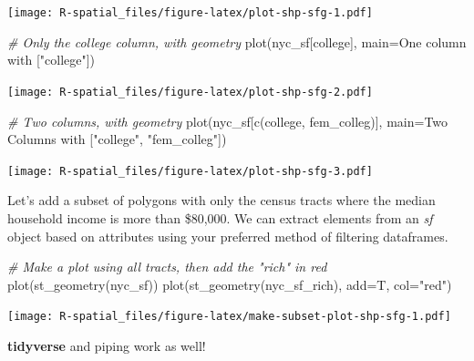 \documentclass[
  11pt,
]{book}
\newenvironment{Shaded}{\begin{snugshade}}{\end{snugshade}}
\newcommand{\AttributeTok}[1]{\textcolor[rgb]{0.77,0.63,0.00}{#1}}
\newcommand{\CommentTok}[1]{\textcolor[rgb]{0.56,0.35,0.01}{\textit{#1}}}
\newcommand{\FunctionTok}[1]{\textcolor[rgb]{0.00,0.00,0.00}{#1}}
\newcommand{\NormalTok}[1]{#1}
\newcommand{\StringTok}[1]{\textcolor[rgb]{0.31,0.60,0.02}{#1}}
\begin{document}
\texttt{[image: R-spatial\_files/figure-latex/plot-shp-sfg-1.pdf]}

\begin{Shaded}
\begin{Highlighting}[]
\CommentTok{\# Only the college column, with geometry}
\FunctionTok{plot}\NormalTok{(nyc\_sf[}\StringTok{\textquotesingle{}college\textquotesingle{}}\NormalTok{], }\AttributeTok{main=}\StringTok{\textquotesingle{}One column with ["college"]\textquotesingle{}}\NormalTok{)}
\end{Highlighting}
\end{Shaded}

\texttt{[image: R-spatial\_files/figure-latex/plot-shp-sfg-2.pdf]}

\begin{Shaded}
\begin{Highlighting}[]
\CommentTok{\# Two columns, with geometry}
\FunctionTok{plot}\NormalTok{(nyc\_sf[}\FunctionTok{c}\NormalTok{(}\StringTok{\textquotesingle{}college\textquotesingle{}}\NormalTok{, }\StringTok{\textquotesingle{}fem\_colleg\textquotesingle{}}\NormalTok{)], }\AttributeTok{main=}\StringTok{\textquotesingle{}Two Columns with ["college", "fem\_colleg"]\textquotesingle{}}\NormalTok{)}
\end{Highlighting}
\end{Shaded}

\texttt{[image: R-spatial\_files/figure-latex/plot-shp-sfg-3.pdf]}

Let's add a subset of polygons with only the census tracts where the median household income is more than \$80,000. We can extract elements from an \emph{sf} object based on attributes using your preferred method of filtering dataframes.

\begin{Shaded}
\begin{Highlighting}[]
\CommentTok{\# Make a plot using all tracts, then add the "rich" in red}
\FunctionTok{plot}\NormalTok{(}\FunctionTok{st\_geometry}\NormalTok{(nyc\_sf))}
\FunctionTok{plot}\NormalTok{(}\FunctionTok{st\_geometry}\NormalTok{(nyc\_sf\_rich), }\AttributeTok{add=}\NormalTok{T, }\AttributeTok{col=}\StringTok{"red"}\NormalTok{)}
\end{Highlighting}
\end{Shaded}

\texttt{[image: R-spatial\_files/figure-latex/make-subset-plot-shp-sfg-1.pdf]}

\textbf{tidyverse} and piping work as well!
\end{document}
